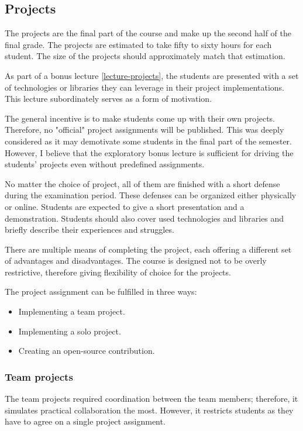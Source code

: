 \documentclass[
  digital,
  color,
  oneside,
  nosansbold,
  nocolorbold,
  lof,
  lot,
]{fithesis4}
\begin{document}
\subsection{Projects}

The projects are the final part of the course and make up the second half of the final grade. The projects are estimated to take fifty to sixty hours for each student. The size of the projects should approximately match that estimation.

As part of a bonus lecture \ref{lecture-projects}, the students are presented with a set of technologies or libraries they can leverage in their project implementations. This lecture subordinately serves as a form of motivation.

The general incentive is to make students come up with their own projects. Therefore, no "official" project assignments will be published. This was deeply considered as it may demotivate some students in the final part of the semester. However, I believe that the exploratory bonus lecture is sufficient for driving the students' projects even without predefined assignments.

No matter the choice of project, all of them are finished with a short defense during the examination period. These defenses can be organized either physically or online. Students are expected to give a short presentation and a demonstration. Students should also cover used technologies and libraries and briefly describe their experiences and struggles.

There are multiple means of completing the project, each offering a different set of advantages and disadvantages. The course is designed not to be overly restrictive, therefore giving flexibility of choice for the projects.

The project assignment can be fulfilled in three ways:
\begin{itemize}
 \item Implementing a team project.
 \item Implementing a solo project.
 \item Creating an open-source contribution.
\end{itemize}

\subsubsection{Team projects}

The team projects required coordination between the team members; therefore, it simulates practical collaboration the most. However, it restricts students as they have to agree on a single project assignment. 
\end{document}
